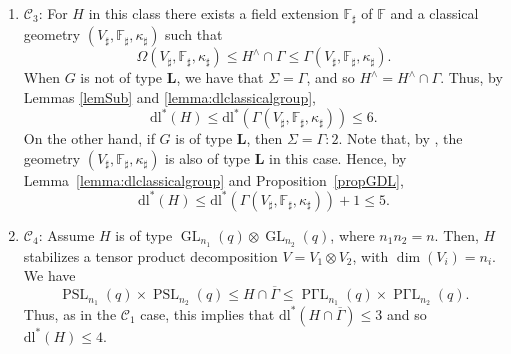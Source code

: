 \documentclass[11pt]{amsart}
\numberwithin{equation}{section}
\theoremstyle{definition}
\theoremstyle{remark}
\DeclareMathOperator{\GL}{GL}
\DeclareMathOperator{\SL}{SL}
\newcommand{\dll}{\mathrm{dl^*}}
\newcommand{\dl}{\mathrm{dl}}
\newcommand{\boldL}{\mathbf{L}}
\DeclareMathOperator{\PGammaL}{P \Gamma L}
\DeclareMathOperator{\PSL}{PSL}
\DeclareMathOperator{\GammaO}{\Gamma O}
\let\O\relax
\DeclareMathOperator{\O}{O}
\begin{document}
\begin{enumerate}
    If $H$ is of type $\GL_{n/2}(q^u).2$, then $\SL_{n/2}(q^u) \leqslant H^\wedge \cap \Omega \leqslant \GL_{n/2}(q^u).2$, and so by Proposition~\ref{propGDL} and Lemma~\ref{lemma:dlclassicalgroup} we have that 
    \begin{align*}
        \dll(H) & \leq \dll(H^\wedge \cap \Omega) + \dl(\overline \Sigma/\overline \Omega) \\
        & \leq \dll(\GL_{n/2}(q^u)) + \dl(C_2) + \dl(\overline \Sigma/\overline \Omega)\\
        & \leq 4 + 1 + 2.
    \end{align*}

    If $H$ is of type $\O_{n/2}(q)^2$, then $H^\wedge$ is contained in $\GammaO_{n/2}(q)^2 : C_2$ and contains $\Omega_{n/2}(q)^2$, so as previously we have that $\dll(H^\wedge) \leq 6$.
    
    \item $\mathscr C_3$: For $H$ in this class there exists a field extension $\mathbb F_\sharp$ of $\mathbb F$ and a classical geometry $(V_\sharp, \mathbb{F}_\sharp, \kappa_\sharp)$ such that
    \[
        \Omega(V_\sharp, \mathbb F_\sharp, \kappa_\sharp) 
        \leqslant H^\wedge \cap \Gamma \leqslant
        \Gamma(V_\sharp, \mathbb{F}_\sharp, \kappa_\sharp).
    \]
    When $G$ is not of type $\boldL$, we have that $\Sigma = \Gamma$, and so $H^{\wedge} = H^\wedge \cap \Gamma$. Thus, by Lemmas \ref{lemSub} and \ref{lemma:dlclassicalgroup},
    \[
        \dll(H) \leq \dll(\Gamma(V_\sharp, \mathbb{F}_\sharp, \kappa_\sharp)) \leq 6.
    \]
    On the other hand, if $G$ is of type $\boldL$, then $\Sigma = \Gamma :2$. Note that, by \cite[Sec.~4.3]{KL90}, the geometry $(V_\sharp, \mathbb F_\sharp, \kappa_\sharp)$ is also of type $\boldL$ in this case. Hence, by Lemma~\ref{lemma:dlclassicalgroup} and Proposition~\ref{propGDL},
    \[
        \dll(H) \leq \dll(\Gamma(V_\sharp, \mathbb{F}_\sharp, \kappa_\sharp)) + 1 \leq 5.
    \]
    
    \item $\mathscr C_4$: Assume $H$ is of type $\GL_{n_1}(q) \otimes \GL_{n_2}(q)$, where $n_1 n_2 = n$. Then, $H$ stabilizes a tensor product decomposition $V=V_1 \otimes V_2$, with $\dim(V_i) = n_i$. We have
    \[
        \PSL_{n_1}(q) \times \PSL_{n_2}(q) 
        \leqslant H \cap \overline \Gamma \leqslant
        \PGammaL_{n_1}(q) \times \PGammaL_{n_2}(q).
    \]
    Thus, as in the $\mathscr{C}_1$ case, this implies that $\dll(H \cap \overline \Gamma) \leq 3$ and so $\dll(H) \leq 4$.


\end{enumerate}
\end{document}
